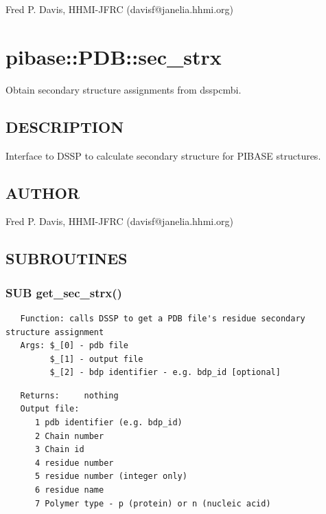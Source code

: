 \documentclass{article}
\begin{document}
Fred P. Davis, HHMI-JFRC (davisf@janelia.hhmi.org)

\clearpage
\section{pibase::PDB::sec\_strx\label{pibase::PDB::sec_strx}}


Obtain secondary structure assignments from dsspcmbi.

\subsection*{DESCRIPTION\label{pibase::PDB::sec_strx_DESCRIPTION}}


Interface to DSSP to calculate secondary structure for PIBASE structures.

\subsection*{AUTHOR\label{pibase::PDB::sec_strx_AUTHOR}}


Fred P. Davis, HHMI-JFRC (davisf@janelia.hhmi.org)

\subsection*{SUBROUTINES\label{pibase::PDB::sec_strx_SUBROUTINES}}
\subsubsection*{SUB get\_sec\_strx()\label{pibase::PDB::sec_strx_SUB_get_sec_strx_}}
\begin{verbatim}
   Function: calls DSSP to get a PDB file's residue secondary structure assignment
   Args: $_[0] - pdb file
         $_[1] - output file
         $_[2] - bdp identifier - e.g. bdp_id [optional]
\end{verbatim}
\begin{verbatim}
   Returns:     nothing
   Output file:
      1 pdb identifier (e.g. bdp_id)
      2 Chain number
      3 Chain id
      4 residue number
      5 residue number (integer only)
      6 residue name
      7 Polymer type - p (protein) or n (nucleic acid)
\end{verbatim}
\end{document}
